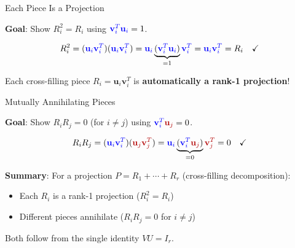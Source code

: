 \documentclass[10pt]{beamer}
\theoremstyle{definition}
\newcommand{\x}[1]{\alert{\textbf{#1}}}
\newcommand{\bl}[1]{{\color{blue}#1}}                 %
\newcommand{\rd}[1]{{\color{red!70!black}#1}}         %
\begin{document}
\begin{frame}{Each Piece Is a Projection}

\x{Goal}: Show $R_i^2 = R_i$ using $\bl{\mathbf{v}_i^T} \bl{\mathbf{u}_i} = 1$.

\vspace{0.5em}

$$R_i^2 = (\bl{\mathbf{u}_i} \bl{\mathbf{v}_i^T})(\bl{\mathbf{u}_i} \bl{\mathbf{v}_i^T}) = \bl{\mathbf{u}_i} \underbrace{(\bl{\mathbf{v}_i^T} \bl{\mathbf{u}_i})}_{= 1} \bl{\mathbf{v}_i^T} = \bl{\mathbf{u}_i} \bl{\mathbf{v}_i^T} = R_i \quad\checkmark$$

\vspace{0.5em}

Each cross-filling piece $R_i = \mathbf{u}_i \mathbf{v}_i^T$ is \x{automatically a rank-1 projection}!

\end{frame}

\begin{frame}{Mutually Annihilating Pieces}

\x{Goal}: Show $R_i R_j = 0$ (for $i \neq j$) using $\bl{\mathbf{v}_i^T} \rd{\mathbf{u}_j} = 0$.

\vspace{0.5em}

$$R_i R_j = (\bl{\mathbf{u}_i} \bl{\mathbf{v}_i^T})(\rd{\mathbf{u}_j} \rd{\mathbf{v}_j^T}) = \bl{\mathbf{u}_i} \underbrace{(\bl{\mathbf{v}_i^T} \rd{\mathbf{u}_j})}_{= 0} \rd{\mathbf{v}_j^T} = 0 \quad\checkmark$$

\vspace{1em}

\x{Summary}: For a projection $P = R_1 + \cdots + R_r$ (cross-filling decomposition):
\begin{itemize}
\item Each $R_i$ is a rank-1 projection ($R_i^2 = R_i$)
\item Different pieces annihilate ($R_i R_j = 0$ for $i \neq j$)
\end{itemize}

Both follow from the single identity $VU = I_r$.

\end{frame}
\end{document}
